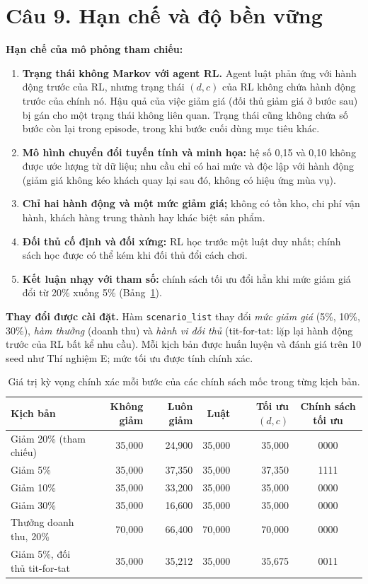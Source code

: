 \documentclass[12pt,a4paper]{report}
\newcommand{\SRC}{../agent02_experiment.py}
\newcommand{\CodeLines}[2]{\VerbatimInput[fontsize=\scriptsize,frame=single,
  breaklines=true,numbers=left,numbersep=4pt,firstline=#1,lastline=#2,
  baselinestretch=1.0]{\SRC}}
\begin{document}
\section*{Câu 9. Hạn chế và độ bền vững}
\textbf{Hạn chế của mô phỏng tham chiếu:}
\begin{enumerate}
\item \textbf{Trạng thái không Markov với agent RL.} Agent luật phản ứng với hành
  động trước của RL, nhưng trạng thái $(d,c)$ của RL không chứa hành động trước
  của chính nó. Hậu quả của việc giảm giá (đối thủ giảm giá ở bước sau) bị gán cho
  một trạng thái không liên quan. Trạng thái cũng không chứa số bước còn lại trong
  episode, trong khi bước cuối dùng mục tiêu khác.
\item \textbf{Mô hình chuyển đổi tuyến tính và minh họa:} hệ số 0{,}15 và 0{,}10
  không được ước lượng từ dữ liệu; nhu cầu chỉ có hai mức và độc lập với hành động
  (giảm giá không kéo khách quay lại sau đó, không có hiệu ứng mùa vụ).
\item \textbf{Chỉ hai hành động và một mức giảm giá;} không có tồn kho, chi phí
  vận hành, khách hàng trung thành hay khác biệt sản phẩm.
\item \textbf{Đối thủ cố định và đối xứng:} RL học trước một luật duy nhất; chính
  sách học được có thể kém khi đối thủ đổi cách chơi.
\item \textbf{Kết luận nhạy với tham số:} chính sách tối ưu đổi hẳn khi mức giảm giá
  đổi từ 20\% xuống 5\% (Bảng~\ref{tab:exact}).
\end{enumerate}

\textbf{Thay đổi được cài đặt.} Hàm \texttt{scenario\_list} thay đổi \emph{mức giảm
giá} (5\%, 10\%, 30\%), \emph{hàm thưởng} (doanh thu) và \emph{hành vi đối thủ}
(tit-for-tat: lặp lại hành động trước của RL bất kể nhu cầu). Mỗi kịch bản được huấn
luyện và đánh giá trên 10 seed như Thí nghiệm E; mức tối ưu được tính chính xác.
\CodeLines{1567}{1584}

\begin{table}[H]
\centering
\small
\caption{Giá trị kỳ vọng chính xác mỗi bước của các chính sách mốc trong từng kịch bản.}
\label{tab:exact}
\begin{tabular}{lrrrrc}
\toprule
Kịch bản & Không giảm & Luôn giảm & Luật & Tối ưu $(d,c)$ & Chính sách tối ưu \\
\midrule
Giảm 20\% (tham chiếu) & 35{,}000 & 24{,}900 & 35{,}000 & 35{,}000 & 0000 \\
Giảm 5\% & 35{,}000 & 37{,}350 & 35{,}000 & 37{,}350 & 1111 \\
Giảm 10\% & 35{,}000 & 33{,}200 & 35{,}000 & 35{,}000 & 0000 \\
Giảm 30\% & 35{,}000 & 16{,}600 & 35{,}000 & 35{,}000 & 0000 \\
Thưởng doanh thu, 20\% & 70{,}000 & 66{,}400 & 70{,}000 & 70{,}000 & 0000 \\
Giảm 5\%, đối thủ tit-for-tat & 35{,}000 & 35{,}212 & 35{,}000 & 35{,}675 & 0011 \\
\bottomrule
\end{tabular}
\end{table}
\end{document}
